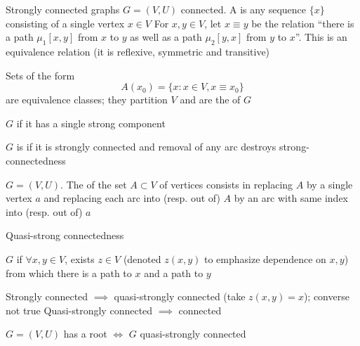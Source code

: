\documentclass[aspectratio=169]{beamer}\usepackage[]{graphicx}\usepackage[]{xcolor}
\begin{document}
	
	\begin{frame}{Strongly connected graphs}
		$G=(V,U)$ connected. 
		A  is any sequence $\{x\}$ consisting of a single vertex $x\in V$
		\vfill
		For $x,y\in V$, let $x\equiv y$ be the relation ``there is a path $\mu_1[x,y]$ from $x$ to $y$ as well as a path $\mu_2[y,x]$ from $y$ to $x$''. This is an equivalence relation (it is reflexive, symmetric and transitive)
		\vfill
		\begin{definition}\label{def:strong_components}
		Sets of the form 
		\[
		A(x_0)=\{x:x\in V, x\equiv x_0\}	
		\]
		are equivalence classes; they partition $V$ and are the  of $G$	
		\end{definition}
		\vfill
		\begin{definition}
		\label{def:strongly_connected_graph}
		$G$  if it has a single strong component
		\end{definition}
\end{frame}
		

\begin{frame}
	\begin{definition}
	$G$ is  if it is strongly connected and removal of any arc destroys strong-connectedness
	\end{definition}
	\vfill
	\begin{definition}[Contraction]
	$G=(V,U)$. The  of the set $A\subset V$ of vertices consists in replacing $A$ by a single vertex $a$ and replacing each arc into (resp. out of) $A$ by an arc with same index into (resp. out of) $a$
	\end{definition}
\end{frame}
	
		
\begin{frame}{Quasi-strong connectedness}
	\begin{definition}
	$G$  if $\forall x,y\in V$, exists $z\in V$ (denoted $z(x,y)$ to emphasize dependence on $x,y$) from which there is a path to $x$ and a path to $y$
	\end{definition}
	\vfill
	Strongly connected $\implies$ quasi-strongly connected (take $z(x,y)=x$); converse not true
	\vfill
	Quasi-strongly connected $\implies$ connected
	\vfill
	\begin{lemma}
	$G=(V,U)$ has a root $\iff$ $G$ quasi-strongly connected
	\end{lemma}
\end{frame}
\end{document}
